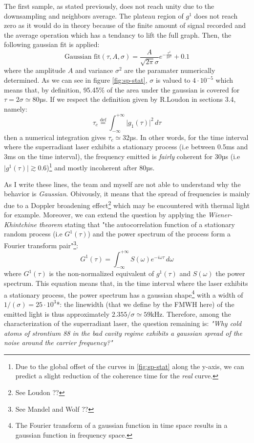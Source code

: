 \documentclass[10pt]{report}
\begin{document}
The first sample, as stated previously, does not reach unity due to the downsampling and neighbors average. The plateau region of $g^1$ does not reach zero as it would do in theory because of the finite amount of signal recorded and the average operation which has a tendancy to lift the full graph. Then, the following gaussian fit is applied:
\begin{equation}
\textrm{Gaussian fit}(\tau, A, \sigma) = \frac{A}{\sqrt{2\pi}\sigma} e^{-\frac{\tau^2}{2\sigma^2}} + 0.1
\end{equation}
where the amplitude $A$ and variance $\sigma^2$ are the paramater numerically determined. As we can see in figure \ref{fig:sp-stat}, $\sigma$ is valued to $4\cdot10^{-5}$ which means that, by definition, 95.45\% of the area under the gaussian is covered for $\tau=2\sigma\simeq 80$µs. If we respect the definition given by R.Loudon in sections 3.4, namely:
\begin{equation}
\tau_c \stackrel{\text{def}}{=} \int_{-\infty}^{+\infty} \vert g_1(\tau) \vert^2 \, d\tau
\end{equation} 
then a numerical integration gives $\tau_c \simeq 32$µs. In other words, for the time interval where the superradiant laser exhibits a stationary process (i.e between 0.5ms and 3ms on the time interval), the frequency emitted is \textit{fairly} coherent for 30µs (i.e $\vert g^1(\tau) \vert \gtrsim 0.6$)\footnote{Due to the global offset of the curves in \ref{fig:sp-stat} along the y-axis, we can predict a slight reduction of the coherence time for the \textit{real} curve.} and mostly incoherent after 80µs.

As I write these lines, the team and myself are not able to understand why the behavior is \textit{Gaussian}. Obivously, it means that the spread of frequencies is mainly due to a Doppler broadening effect\footnote{See Loudon ??} which may be encountered with thermal light for example. Moreover, we can extend the question by applying the \textit{Wiener-Khintchine theorem} stating that "the autocorrelation function of a stationary random process (i.e $G^1(\tau)$) and the power spectrum of the process form a Fourier transform pair"\footnote{See Mandel and Wolf ??}:
\begin{equation}
G^1(\tau) = \int_{-\infty}^{+\infty} S(\omega) e^{-i\omega\tau} \,d\omega
\end{equation}
where $G^1(\tau)$ is the non-normalized equivalent of $g^1(\tau)$ and $S(\omega)$ the power spectrum. This equation means that, in the time interval where the laser exhibits a stationary process, the power spectrum has a gaussian shape\footnote{The Fourier transform of a gaussian function in time space results in a gaussian function in frequency space.} with a width of $1/(\sigma) = 25\cdot 10^{3}$*: the linewidth (that we define by the FMWH here) of the emitted light is thus approximately $2.355/\sigma \simeq 59$kHz. Therefore, among the characterization of the superradiant laser, the question remaining is: \textit{"Why cold atoms of strontium 88 in the bad cavity regime exhibits a gaussian spread of the noise around the carrier frequency?"}
\end{document}
